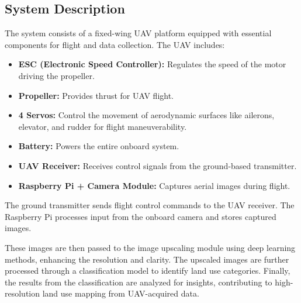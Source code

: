 \subsection{System Description}

The system consists of a fixed-wing UAV platform equipped with essential components for flight and data collection. The UAV includes:

\begin{itemize}
    \item \textbf{ESC (Electronic Speed Controller):} Regulates the speed of the motor driving the propeller.
    \item \textbf{Propeller:} Provides thrust for UAV flight.
    \item \textbf{4 Servos:} Control the movement of aerodynamic surfaces like ailerons, elevator, and rudder for flight maneuverability.
    \item \textbf{Battery:} Powers the entire onboard system.
    \item \textbf{UAV Receiver:} Receives control signals from the ground-based transmitter.
    \item \textbf{Raspberry Pi + Camera Module:} Captures aerial images during flight.
\end{itemize}

The ground transmitter sends flight control commands to the UAV receiver. The Raspberry Pi processes input from the onboard camera and stores captured images.

These images are then passed to the image upscaling module using deep learning methods, enhancing the resolution and clarity. The upscaled images are further processed through a classification model to identify land use categories.
Finally, the results from the classification are analyzed for insights, contributing to high-resolution land use mapping from UAV-acquired data.


